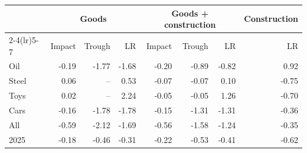 \begin{tabular}{lrrrrrrr}
\toprule
 & \multicolumn{3}{c}{Goods} & \multicolumn{3}{c}{Goods + construction} & Construction \\
\cmidrule(lr){2-4}\cmidrule(lr){5-7}
 & Impact & Trough & LR & Impact & Trough & LR & LR \\
\midrule
Oil & -0.19 & -1.77 & -1.68 & -0.20 & -0.89 & -0.82 & 0.92 \\
Steel & 0.06 & -- & 0.53 & -0.07 & -0.07 & 0.10 & -0.75 \\
Toys & 0.02 & -- & 2.24 & -0.05 & -0.05 & 1.26 & -0.70 \\
Cars & -0.16 & -1.78 & -1.78 & -0.15 & -1.31 & -1.31 & -0.36 \\
All & -0.59 & -2.12 & -1.69 & -0.56 & -1.58 & -1.24 & -0.35 \\
2025 & -0.18 & -0.46 & -0.31 & -0.22 & -0.53 & -0.41 & -0.62 \\
\bottomrule
\end{tabular}
